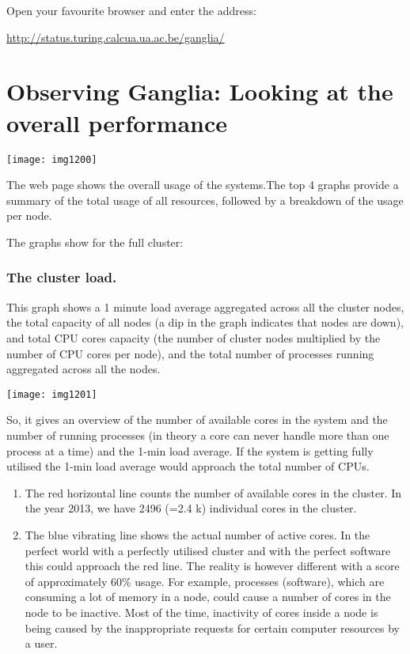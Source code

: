 Open your favourite browser and enter the address:

\url{http://status.turing.calcua.ua.ac.be/ganglia/}

\section{Observing Ganglia: Looking at the overall performance}

\texttt{[image: img1200]}

The web page shows the overall usage of the \hpc systems.The top 4 graphs
provide a summary of the total usage of all \hpc resources, followed by a
breakdown of the usage per node.

The graphs show for the full cluster:

\subsubsection{The cluster load.}

This graph shows a 1 minute load average aggregated across all the cluster
nodes, the total capacity of all nodes (a dip in the graph indicates that nodes
are down), and total CPU cores capacity (the number of cluster nodes multiplied
by the number of CPU cores per node), and the total number of processes running
aggregated across all the nodes.

\texttt{[image: img1201]}

So, it gives an overview of the number of available cores in the system and the
number of running processes (in theory a core can never handle more than one
process at a time) and the 1-min load average. If the system is getting fully
utilised the 1-min load average would approach the total number of CPUs.

\begin{enumerate}
\item  The red horizontal line counts the number of available cores in the cluster. In the year 2013, we have 2496 (=2.4 k) individual cores in the cluster.
\item  The blue vibrating line shows the actual number of active cores. In the perfect world with a perfectly utilised cluster and with the perfect software this could approach the red line. The reality is however different with a score of approximately 60\% usage. For example, processes (software), which are consuming a lot of memory in a node, could cause a number of cores in the node to be inactive.  Most of the time, inactivity of cores inside a node is being caused by the inappropriate requests for certain computer resources by a user.
\end{enumerate}

